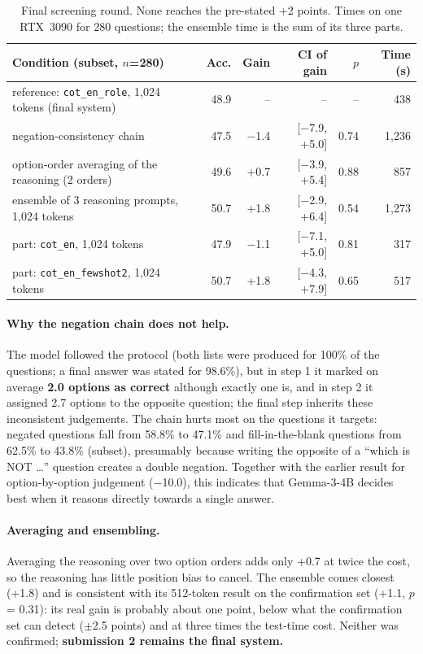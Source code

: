 \documentclass[10pt,a4paper]{article}
\newcommand{\cond}[1]{\texttt{#1}}
\begin{document}
\begin{table}[h]
\centering\footnotesize\setlength{\tabcolsep}{4pt}
\begin{tabular}{lrrrrr}
\toprule
Condition (subset, $n$=280) & Acc. & Gain & CI of gain & $p$ & Time (s)\\
\midrule
reference: \cond{cot\_en\_role}, 1,024 tokens (final system) & 48.9 & -- & -- & -- & 438\\
negation-consistency chain & 47.5 & $-$1.4 & [$-$7.9, +5.0] & 0.74 & 1,236\\
option-order averaging of the reasoning (2 orders) & 49.6 & +0.7 & [$-$3.9, +5.4] & 0.88 & 857\\
ensemble of 3 reasoning prompts, 1,024 tokens & 50.7 & +1.8 & [$-$2.9, +6.4] & 0.54 & 1,273\\
\quad part: \cond{cot\_en}, 1,024 tokens & 47.9 & $-$1.1 & [$-$7.1, +5.0] & 0.81 & 317\\
\quad part: \cond{cot\_en\_fewshot2}, 1,024 tokens & 50.7 & +1.8 & [$-$4.3, +7.9] & 0.65 & 517\\
\bottomrule
\end{tabular}
\caption{Final screening round. None reaches the pre-stated +2 points. Times on one RTX~3090 for 280 questions; the
ensemble time is the sum of its three parts.}
\label{tab:final_round}
\end{table}

\paragraph{Why the negation chain does not help.} The model followed the protocol (both lists were produced for
100\% of the questions; a final answer was stated for 98.6\%), but in step 1 it marked on average \textbf{2.0 options
as correct} although exactly one is, and in step 2 it assigned 2.7 options to the opposite question; the final step
inherits these inconsistent judgements. The chain hurts most on the questions it targets: negated questions fall from
58.8\% to 47.1\% and fill-in-the-blank questions from 62.5\% to 43.8\% (subset), presumably because writing the
opposite of a ``which is NOT \ldots'' question creates a double negation. Together with the earlier result for
option-by-option judgement ($-$10.0), this indicates that Gemma-3-4B decides best when it reasons directly towards a
single answer.

\paragraph{Averaging and ensembling.} Averaging the reasoning over two option orders adds only +0.7 at twice the
cost, so the reasoning has little position bias to cancel. The ensemble comes closest (+1.8) and is consistent with
its 512-token result on the confirmation set (+1.1, $p$ = 0.31): its real gain is probably about one point, below what
the confirmation set can detect ($\pm$2.5 points) and at three times the test-time cost. Neither was confirmed;
\textbf{submission 2 remains the final system.}
\end{document}
